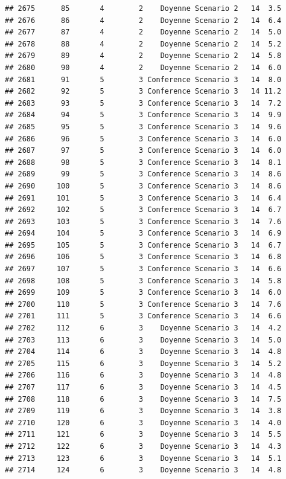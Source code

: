 \documentclass[
]{article}
\begin{document}
\begin{verbatim}
## 2675      85       4        2    Doyenne Scenario 2   14  3.5
## 2676      86       4        2    Doyenne Scenario 2   14  6.4
## 2677      87       4        2    Doyenne Scenario 2   14  5.0
## 2678      88       4        2    Doyenne Scenario 2   14  5.2
## 2679      89       4        2    Doyenne Scenario 2   14  5.8
## 2680      90       4        2    Doyenne Scenario 2   14  6.0
## 2681      91       5        3 Conference Scenario 3   14  8.0
## 2682      92       5        3 Conference Scenario 3   14 11.2
## 2683      93       5        3 Conference Scenario 3   14  7.2
## 2684      94       5        3 Conference Scenario 3   14  9.9
## 2685      95       5        3 Conference Scenario 3   14  9.6
## 2686      96       5        3 Conference Scenario 3   14  6.0
## 2687      97       5        3 Conference Scenario 3   14  6.0
## 2688      98       5        3 Conference Scenario 3   14  8.1
## 2689      99       5        3 Conference Scenario 3   14  8.6
## 2690     100       5        3 Conference Scenario 3   14  8.6
## 2691     101       5        3 Conference Scenario 3   14  6.4
## 2692     102       5        3 Conference Scenario 3   14  6.7
## 2693     103       5        3 Conference Scenario 3   14  7.6
## 2694     104       5        3 Conference Scenario 3   14  6.9
## 2695     105       5        3 Conference Scenario 3   14  6.7
## 2696     106       5        3 Conference Scenario 3   14  6.8
## 2697     107       5        3 Conference Scenario 3   14  6.6
## 2698     108       5        3 Conference Scenario 3   14  5.8
## 2699     109       5        3 Conference Scenario 3   14  6.0
## 2700     110       5        3 Conference Scenario 3   14  7.6
## 2701     111       5        3 Conference Scenario 3   14  6.6
## 2702     112       6        3    Doyenne Scenario 3   14  4.2
## 2703     113       6        3    Doyenne Scenario 3   14  5.0
## 2704     114       6        3    Doyenne Scenario 3   14  4.8
## 2705     115       6        3    Doyenne Scenario 3   14  5.2
## 2706     116       6        3    Doyenne Scenario 3   14  4.8
## 2707     117       6        3    Doyenne Scenario 3   14  4.5
## 2708     118       6        3    Doyenne Scenario 3   14  7.5
## 2709     119       6        3    Doyenne Scenario 3   14  3.8
## 2710     120       6        3    Doyenne Scenario 3   14  4.0
## 2711     121       6        3    Doyenne Scenario 3   14  5.5
## 2712     122       6        3    Doyenne Scenario 3   14  4.3
## 2713     123       6        3    Doyenne Scenario 3   14  5.1
## 2714     124       6        3    Doyenne Scenario 3   14  4.8

\end{verbatim}
\end{document}
